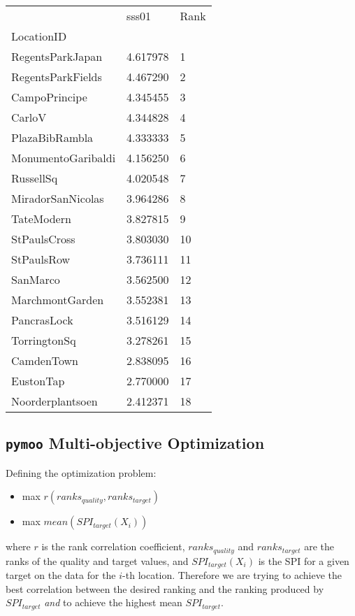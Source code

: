 \documentclass[
  letterpaper,
  DIV=11,
  numbers=noendperiod]{scrartcl}
\providecommand{\tightlist}{%
  \setlength{\itemsep}{0pt}\setlength{\parskip}{0pt}}\usepackage{longtable,booktabs,array}
\begin{document}
\begin{longtable}[]{@{}lll@{}}
\toprule\noalign{}
& sss01 & Rank \\
LocationID & & \\
\midrule\noalign{}
\endhead
\bottomrule\noalign{}
\endlastfoot
RegentsParkJapan & 4.617978 & 1 \\
RegentsParkFields & 4.467290 & 2 \\
CampoPrincipe & 4.345455 & 3 \\
CarloV & 4.344828 & 4 \\
PlazaBibRambla & 4.333333 & 5 \\
MonumentoGaribaldi & 4.156250 & 6 \\
RussellSq & 4.020548 & 7 \\
MiradorSanNicolas & 3.964286 & 8 \\
TateModern & 3.827815 & 9 \\
StPaulsCross & 3.803030 & 10 \\
StPaulsRow & 3.736111 & 11 \\
SanMarco & 3.562500 & 12 \\
MarchmontGarden & 3.552381 & 13 \\
PancrasLock & 3.516129 & 14 \\
TorringtonSq & 3.278261 & 15 \\
CamdenTown & 2.838095 & 16 \\
EustonTap & 2.770000 & 17 \\
Noorderplantsoen & 2.412371 & 18 \\
\end{longtable}

\subsection{\texorpdfstring{\texttt{pymoo} Multi-objective
Optimization}{pymoo Multi-objective Optimization}}\label{pymoo-multi-objective-optimization}

Defining the optimization problem:

\begin{itemize}
\tightlist
\item
  max \(r(ranks_{quality}, ranks_{target})\)
\item
  max \(mean(SPI_{target}(X_i))\)
\end{itemize}

where \(r\) is the rank correlation coefficient, \(ranks_{quality}\) and
\(ranks_{target}\) are the ranks of the quality and target values, and
\(SPI_{target}(X_i)\) is the SPI for a given target on the data for the
\(i\)-th location. Therefore we are trying to achieve the best
correlation between the desired ranking and the ranking produced by
\(SPI_{target}\) \emph{and} to achieve the highest mean
\(SPI_{target}\).
\end{document}

